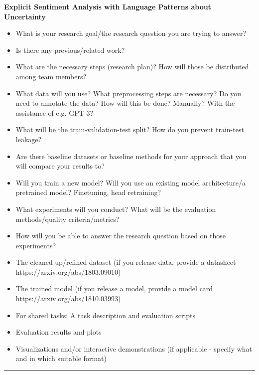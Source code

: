 \documentclass[a4paper,12pt,numbers=enddot]{scrartcl}
\begin{document}
\singlespacing

\begin{Large}
\begin{center}
\textbf{Explicit Sentiment Analysis with Language Patterns about Uncertainty}
\end{center}
\end{Large}

\begin{itemize}
	\setlength\itemsep{-5pt}
	\item What is your research goal/the research question you are trying to answer?
	\item Is there any previous/related work?
	\item What are the necessary steps (research plan)? How will those be distributed among 	team members?
	\item What data will you use? What preprocessing steps are necessary? Do you need to annotate the data? How will this be done? Manually? With the assistance of e.g. GPT-3?
	\item What will be the train-validation-test split? How do you prevent train-test leakage?
	\item Are there baseline datasets or baseline methods for your approach that you will compare your results to?
	\item Will you train a new model? Will you use an existing model architecture/a pretrained model? Finetuning, head retraining?
	\item What experiments will you conduct? What will be the evaluation methods/quality criteria/metrics?
	\item How will you be able to answer the research question based on those experiments?
\end{itemize}

\begin{itemize}
	\setlength\itemsep{-5pt}
	\item The cleaned up/refined dataset (if you release data, provide a datasheet https://arxiv.org/abs/1803.09010)
	\item The trained model (if you release a model, provide a model card https://arxiv.org/abs/1810.03993)
	\item For shared tasks: A task description and evaluation scripts
	\item Evaluation results and plots
	\item Visualizations and/or interactive demonstrations (if applicable - specify what and in which suitable format)
\end{itemize}

\hrule
\vspace{-2.5em}
\renewcommand{\refname}{}
\nocite{*}

\end{document}
